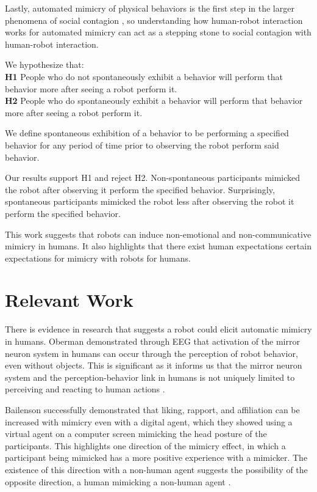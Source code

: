 \documentclass{acm_proc_article-sp}
\begin{document}
Lastly, automated mimicry of physical behaviors is the first step in the larger phenomena of social contagion \cite{chartrand2013antecedents}, so understanding how human-robot interaction works for automated mimicry can act as a stepping stone to social contagion with human-robot interaction.

We hypothesize that:\\
\textbf{H1}	People who do not spontaneously exhibit a behavior will perform that behavior more after seeing a robot perform it.\\
\textbf{H2} People who do spontaneously exhibit a behavior will perform that behavior more after seeing a robot perform it.

We define spontaneous exhibition of a behavior to be performing a specified behavior for any period of time prior to observing the robot perform said behavior.

Our results support H1 and reject H2. Non-spontaneous participants mimicked the robot after observing it perform the specified behavior. Surprisingly, spontaneous participants mimicked the robot less after observing the robot it perform the specified behavior.

This work suggests that robots can induce non-emotional and non-communicative mimicry in humans. It also highlights that there exist human expectations certain expectations for mimicry with robots for humans.

\section{Relevant Work}
There is evidence in research that suggests a robot could elicit automatic mimicry in humans. Oberman demonstrated through EEG that activation of the mirror neuron system in humans can occur through the perception of robot behavior, even without objects. This is significant as it informs us that the mirror neuron system and the perception-behavior link in humans is not uniquely limited to perceiving and reacting to human actions \cite{oberman2007eeg}. 

Bailenson successfully demonstrated that liking, rapport, and affiliation can be increased with mimicry even with a digital agent, which they showed using a virtual agent on a computer screen mimicking the head posture of the participants. This highlights one direction of the mimicry effect, in which a participant being mimicked has a more positive experience with a mimicker. The existence of this direction with a non-human agent suggests the possibility of the opposite direction, a human mimicking a non-human agent \cite{bailenson2005digital}. 
\end{document}
